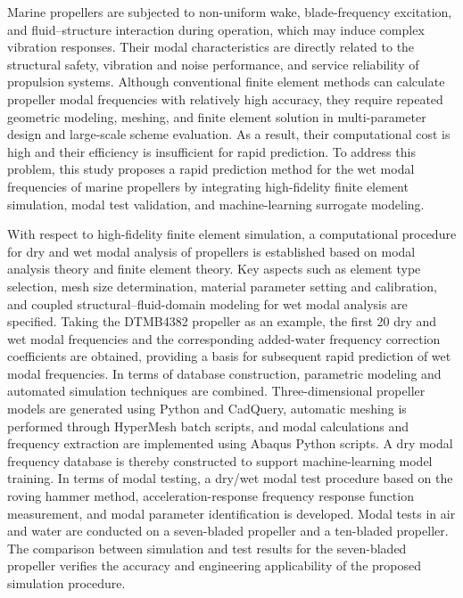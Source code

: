
Marine propellers are subjected to non-uniform wake, blade-frequency excitation, and fluid–structure interaction during operation, which may induce complex vibration responses. Their modal characteristics are directly related to the structural safety, vibration and noise performance, and service reliability of propulsion systems. Although conventional finite element methods can calculate propeller modal frequencies with relatively high accuracy, they require repeated geometric modeling, meshing, and finite element solution in multi-parameter design and large-scale scheme evaluation. As a result, their computational cost is high and their efficiency is insufficient for rapid prediction. To address this problem, this study proposes a rapid prediction method for the wet modal frequencies of marine propellers by integrating high-fidelity finite element simulation, modal test validation, and machine-learning surrogate modeling.

With respect to high-fidelity finite element simulation, a computational procedure for dry and wet modal analysis of propellers is established based on modal analysis theory and finite element theory. Key aspects such as element type selection, mesh size determination, material parameter setting and calibration, and coupled structural–fluid-domain modeling for wet modal analysis are specified. Taking the DTMB4382 propeller as an example, the first 20 dry and wet modal frequencies and the corresponding added-water frequency correction coefficients are obtained, providing a basis for subsequent rapid prediction of wet modal frequencies. In terms of database construction, parametric modeling and automated simulation techniques are combined. Three-dimensional propeller models are generated using Python and CadQuery, automatic meshing is performed through HyperMesh batch scripts, and modal calculations and frequency extraction are implemented using Abaqus Python scripts. A dry modal frequency database is thereby constructed to support machine-learning model training. In terms of modal testing, a dry/wet modal test procedure based on the roving hammer method, acceleration-response frequency response function measurement, and modal parameter identification is developed. Modal tests in air and water are conducted on a seven-bladed propeller and a ten-bladed propeller. The comparison between simulation and test results for the seven-bladed propeller verifies the accuracy and engineering applicability of the proposed simulation procedure.

